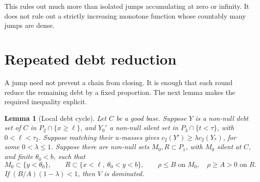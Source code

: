 \documentclass[11pt]{article}
\newtheorem{lemma}[theorem]{Lemma}
\theoremstyle{remark}\newtheorem{remark}[theorem]{Remark}
\begin{document}
This rules out much more than isolated jumps accumulating at zero or
infinity. It does not rule out a strictly increasing monotone function
whose countably many jumps are dense.

\section{Repeated debt reduction}

A jump need not prevent a chain from closing. It is enough that each round
reduce the remaining debt by a fixed proportion. The next lemma makes the
required inequality explicit.

\begin{lemma}[Local debt cycle]\label{lem:contract}
Let $C$ be a good base. Suppose $Y$ is a non-null debt set of $C$ in
$P_2\cap\{x\ge\ell\}$, and $Y_0'$ a non-null silent set in
$P_3\cap\{t<\tau\}$, with $0<\ell<\tau_2$. Suppose matching their
$u$-masses gives $c_2(Y')\ge\lambda c_2(Y_*)$, for some $0<\lambda\le1$.
Suppose there are non-null sets $M_0,R\subset P_1$, with $M_0$ silent
at $C$, and finite $\theta_0<b$, such that
\[
 M_0\subset\{y<\theta_0\},\qquad
 R\subset\{x<\ell,\ \theta_0<y<b\},\qquad
 \rho\le B\text{ on }M_0,\quad \rho\ge A>0\text{ on }R.
\]
If $(B/A)(1-\lambda)<1$, then $V$ is dominated.
\end{lemma}
\end{document}
